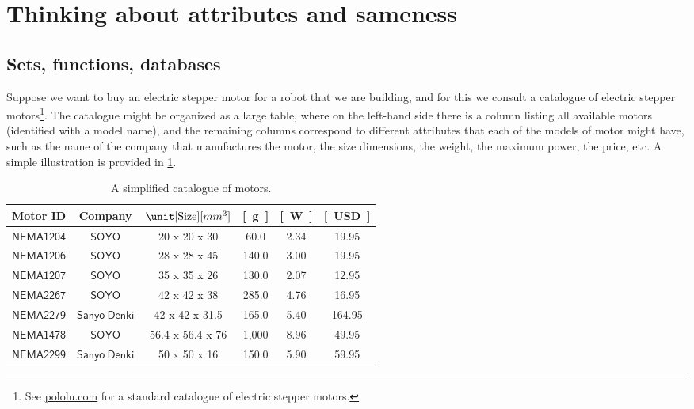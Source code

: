 \section{Thinking about attributes and sameness}


\subsection{Sets, functions, databases}

Suppose we want to buy an electric stepper motor for a robot that we are building, and for this we consult a catalogue of electric stepper motors\footnote{See \href{https://www.pololu.com/category/87/stepper-motors}{pololu.com} for a standard catalogue of electric stepper motors.}. The catalogue might be organized as a large table, where on the left-hand side there is a column listing all available motors (identified with a model name), and the remaining columns correspond to different attributes that each of the models of motor might have, such as the name of the company that manufactures the motor, the size dimensions, the weight, the maximum power, the price, etc. A simple illustration is provided in \cref{tab:currencycompanies}.
\begin{table}[h]
    \centering
    \begin{tabular}{c|c|c|c|c|c}
         Motor ID & Company& $\unit[\text{Size}]{[mm^3]}$ & \unit[Weight]{[g]} & \unit[Max Power]{[W]} & \unit[Cost]{[USD]} \\
         \hline
         $\mathsf{NEMA1204}$&$\mathsf{SOYO}$ & 20 x 20 x 30& 60.0 &2.34 &19.95\\
         $\mathsf{NEMA1206}$&$\mathsf{SOYO}$ &28 x 28 x 45& 140.0 &3.00 &19.95\\
         $\mathsf{NEMA1207}$&$\mathsf{SOYO}$ &35 x 35 x 26& 130.0 &2.07 &12.95\\
         $\mathsf{NEMA2267}$&$\mathsf{SOYO}$ &42 x 42 x 38& 285.0 &4.76 &16.95\\
         $\mathsf{NEMA2279}$&$\mathsf{Sanyo \ Denki}$ &42 x 42 x 31.5& 165.0  &5.40 & 164.95\\
        $\mathsf{NEMA1478}$&$\mathsf{SOYO}$ & 56.4 x 56.4 x 76& 1,000 & 8.96&49.95\\
        $\mathsf{NEMA2299}$&$\mathsf{Sanyo\ Denki}$ & 50 x 50 x 16& 150.0 &5.90&59.95
    \end{tabular}
    \caption{A simplified catalogue of motors.}
    \label{tab:currencycompanies}
\end{table}

